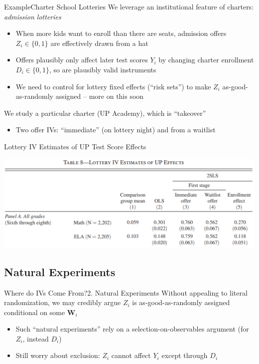\documentclass{beamer}
\begin{document}
\begin{frame}{Example}{Charter School Lotteries}
We leverage an institutional feature of charters: \emph{admission lotteries}
\begin{itemize}
  \item When more kids want to enroll than there are seats, admission offers $Z_i\in\{0,1\}$ are effectively drawn from a hat\pause{}

  \item Offers plausibly only affect later test scores $Y_i$ by changing charter enrollment $D_i\in\{0,1\}$, so are plausibly valid instruments\pause{}

  \item We need to control for lottery fixed effects (``risk sets'') to make $Z_i$ as-good-as-randomly assigned -- more on this soon
\end{itemize}
\pause\medskip

We study a particular charter (UP Academy), which is ``takeover''
\begin{itemize}
  \item Two offer IVs: ``immediate'' (on lottery night) and from a waitlist
\end{itemize}

\end{frame}

\begin{frame}{Lottery IV Estimates of UP Test Score Effects}

\begin{center}
\includegraphics[scale=0.32]{./lecture_includes/charters1.png}
\end{center}

\end{frame}

\subsection{Natural Experiments}
\begin{frame}{Where do IVs Come From?}{2. Natural Experiments}
Without appealing to literal randomization, we may credibly argue $Z_i$ is as-good-as-randomly assigned conditional on some $\mathbf{W}_i$
\begin{itemize}
  \item Such ``natural experiments'' rely on a selection-on-observables argument (for $Z_i$, instead $D_i$)

  \item Still worry about exclusion: $Z_i$ cannot affect $Y_i$ except through $D_i$
\end{itemize}
\end{frame}
\end{document}
